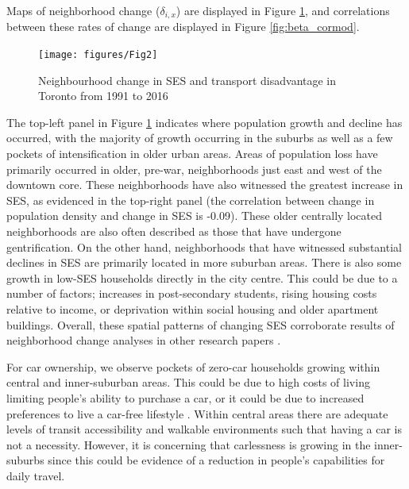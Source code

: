 Maps of neighborhood change ($\delta_{i,x}$) are displayed in Figure \ref{fig:change_maps}, and correlations between these rates of change are displayed in Figure \ref{fig:beta_cormod}. 



\begin{figure}[H]
	\centering
	\vspace{-0.2in}
	\hspace*{-0.333in}
	\texttt{[image: figures/Fig2]}
	\caption{{Neighbourhood change in SES and transport disadvantage in Toronto from 1991 to 2016}}
	\label{fig:change_maps}
	
\end{figure}


The top-left panel in Figure \ref{fig:change_maps} indicates where population growth and decline has occurred, with the majority of growth occurring in the suburbs as well as a few pockets of intensification in older urban areas. Areas of population loss have primarily occurred in older, pre-war, neighborhoods just east and west of the downtown core. These neighborhoods have also witnessed the greatest increase in SES, as evidenced in the top-right panel (the correlation between change in population density and change in SES is -0.09). These older centrally located neighborhoods are also often described as those that have undergone gentrification. On the other hand, neighborhoods that have witnessed substantial declines in SES are primarily located in more suburban areas. There is also some growth in low-SES households directly in the city centre. This could be due to a number of factors; increases in post-secondary students, rising housing costs relative to income, or deprivation within social housing and older apartment buildings. Overall, these spatial patterns of changing SES corroborate results of neighborhood change analyses in other research papers \cite{ades_are_2012,breau_pulling_2018,hulchanski_three_2010,pavlic_declining_2014}. 


For car ownership, we observe pockets of zero-car households growing within central and inner-suburban areas. This could be due to high costs of living limiting people's ability to purchase a car, or it could be due to increased preferences to live a car-free lifestyle . Within central areas there are adequate levels of transit accessibility and walkable environments such that having a car is not a necessity. However, it is concerning that carlessness is growing in the inner-suburbs since this could be evidence of a reduction in people's capabilities for daily travel.

